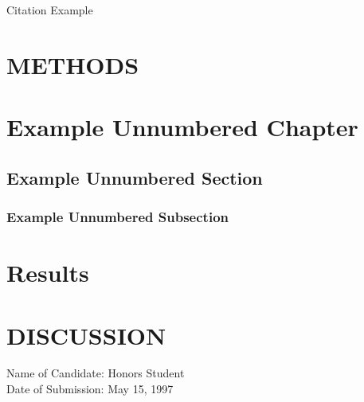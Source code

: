 \documentclass[12pt]{report}
\begin{document}
Citation Example \cite{Nobody06}

\chapter{METHODS}
\lipsum[18-24]

\chapter*{Example Unnumbered Chapter}
\lipsum[24-30] 

\section*{Example Unnumbered Section}
\lipsum[31-35] 

\subsection*{Example Unnumbered Subsection}
\lipsum[36-38] 


\chapter{Results} %
\lipsum[38-42]

\chapter{DISCUSSION}
\lipsum[43-47]


\printbibliography[heading=bibintoc]

\newpage
\thispagestyle{empty} %

\vspace*{90pt}
\begin{center}

    Name of Candidate: Honors Student\\
    Date of Submission: May 15, 1997
    
\end{center}
\end{document}
